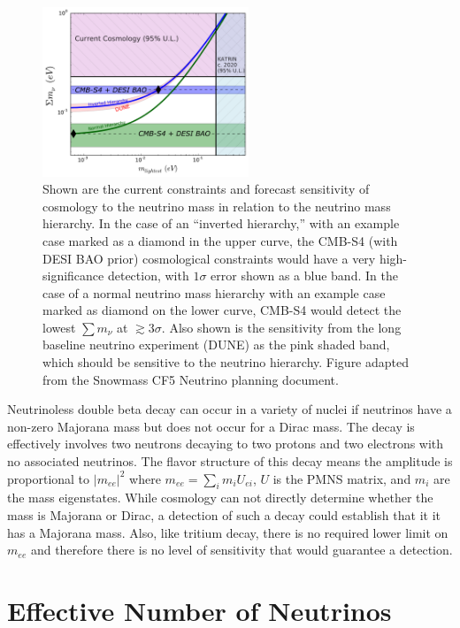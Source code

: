  \begin{figure}[h!]
\centering \includegraphics[width=0.55\textwidth]{Neutrinos/numass_combine_dune}
\caption{Shown are the current constraints and forecast sensitivity of
  cosmology to the neutrino mass in relation to the neutrino mass
  hierarchy.  In the case of an ``inverted hierarchy,'' with an
  example case marked as a diamond in the upper curve, the CMB-S4 (with DESI BAO prior)
  cosmological constraints would have a very high-significance
  detection, with $1\sigma$ error shown as a blue band.  In the case
  of a normal neutrino mass hierarchy with an example case marked as
  diamond on the lower curve, CMB-S4 would detect the lowest
  $\sum m_\nu$ at $\gtrsim 3 \sigma$. Also shown is the
  sensitivity from the long baseline neutrino experiment (DUNE) as the
  pink shaded band, which should be sensitive to the neutrino
  hierarchy. Figure adapted from the Snowmass CF5 Neutrino planning document.
 }
\label{fig:neutrino-noose}
\end{figure}

Neutrinoless double beta decay can occur in a variety of nuclei if neutrinos have a non-zero Majorana mass but does not occur for a Dirac mass.  The decay is effectively involves two neutrons decaying to two protons and two electrons with no associated neutrinos.  The flavor structure of this decay means the amplitude is proportional to $|m_{ee}|^2$ where $m_{ee} = \sum_i m_i U_{ei}$, $U$ is the PMNS matrix, and $m_i$ are the mass eigenstates.  While cosmology can not directly determine whether the mass is Majorana or Dirac, a detection of such a decay could establish that it it has a Majorana mass.  Also, like tritium decay, there is no required lower limit on $m_{ee}$ and therefore there is no level of sensitivity that would guarantee a detection.

\section{Effective Number of Neutrinos}


